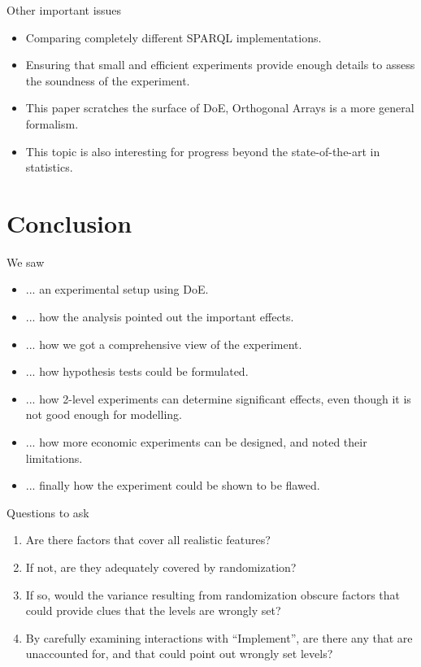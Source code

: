 \documentclass[english,usenames,dvipsnames,aspectratio=169]{beamer}
\begin{document}
\begin{frame}{Other important issues}

  \begin{itemize}
  \item Comparing completely different SPARQL implementations.
  \item Ensuring that small and efficient experiments provide enough
    details to assess the soundness of the experiment.
  \item This paper scratches the surface of DoE, Orthogonal Arrays is
    a more general formalism.
  \item This topic is also interesting for progress beyond the
    state-of-the-art in statistics.
  \end{itemize}
  
\end{frame}

\section{Conclusion}

\begin{frame}
We saw
  \begin{itemize}
  \item ... an experimental setup using DoE.
  \item ... how the analysis pointed out the important effects.
  \item ... how we got a comprehensive view of the experiment.
  \item ... how hypothesis tests could be formulated.
  \item ... how 2-level experiments can determine significant effects,
    even though it is not good enough for modelling.
  \item ... how more economic experiments can be designed, and noted
    their limitations.
  \item ... finally how the experiment could be shown to be flawed.
  \end{itemize}
\end{frame}

\begin{frame}{Questions to ask}

\begin{enumerate}
\item Are there factors that cover all realistic features?
\item If not, are they adequately covered by randomization?
\item If so, would the variance resulting from randomization obscure
  factors that could provide clues that the levels are wrongly set?
\item By carefully examining interactions with ``Implement'', are
  there any that are unaccounted for, and that could point out wrongly
  set levels?
\end{enumerate}

  
\end{frame}
\end{document}
